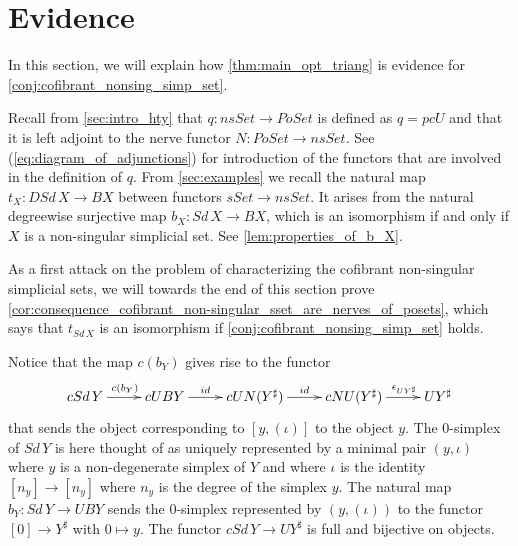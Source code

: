 

\section{Evidence}
\label{sec:evidence}

In this section, we will explain how \cref{thm:main_opt_triang} is evidence for \cref{conj:cofibrant_nonsing_simp_set}.

Recall from \cref{sec:intro_hty} that $q:nsSet\to PoSet$ is defined as $q=pcU$ and that it is left adjoint to the nerve functor $N:PoSet\to nsSet$. See (\ref{eq:diagram_of_adjunctions}) for introduction of the functors that are involved in the definition of $q$. From \cref{sec:examples} we recall the natural map $t_X:DSd\, X\to BX$ between functors $sSet\to nsSet$. It arises from the natural degreewise surjective map $b_X:Sd\, X\to BX$, which is an isomorphism if and only if $X$ is a non-singular simplicial set. See \cref{lem:properties_of_b_X}.

As a first attack on the problem of characterizing the cofibrant non-singular simplicial sets, we will towards the end of this section prove \cref{cor:consequence_cofibrant_non-singular_sset_are_nerves_of_posets}, which says that $t_{Sd\, X}$ is an isomorphism if \cref{conj:cofibrant_nonsing_simp_set} holds.

Notice that the map $c(b_Y)$ gives rise to the functor
\begin{equation}
\label{eq:diagram_proof_of_prop_categorification_of_DSd_vs_B}
\begin{gathered}
\xymatrix{
cSd\, Y \ar[r]^{c(b_Y)} & cUBY \ar[r]^(.45){id} & cUN(Y^\sharp ) \ar[r]^{id} & cNU(Y^\sharp ) \ar[r]^(.6){\epsilon _{UY^\sharp }} & UY^\sharp
}
\end{gathered}
\end{equation}
that sends the object corresponding to $[y,(\iota )]$ to the object $y$. The $0$-simplex of $Sd\, Y$ is here thought of as uniquely represented by a minimal pair $(y,\iota )$ where $y$ is a non-degenerate simplex of $Y$ and where $\iota$ is the identity $[n_y]\to [n_y]$ where $n_y$ is the degree of the simplex $y$. The natural map $b_Y:Sd\, Y\to UBY$ sends the $0$-simplex represented by $(y,(\iota ))$ to the functor $[0]\to Y^\sharp$ with $0\mapsto y$. The functor $cSd\, Y\to UY^\sharp$ is full and bijective on objects.

